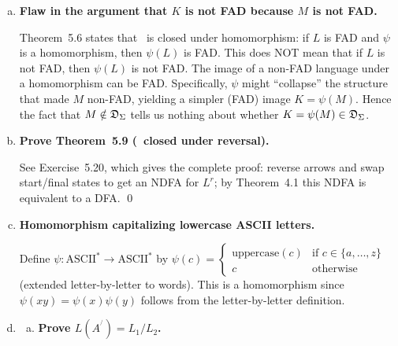 \begin{enumerate}[{5.}1. ]
\begin{enumerate}[(a)]
If we set the final states of $A$ to be the ``midpoint'' states (states reached after processing the first half of words in $L$), we get an automaton that accepts words that reach these midpoint states---but the midpoint states depend on the word being processed, and cannot be determined without knowing the length of the word.  Different words lead to different midpoints; the machine cannot simultaneously track multiple midpoints.  (The ``midpoint'' set would need to be the set of all states from which any final state is reachable in the same number of steps as were taken to reach the midpoint---this is not a fixed set of states for all words.)

\item \textbf{Flaw in the argument that $K$ is not FAD because $M$ is not FAD.}

Theorem~5.6 states that \DSIG\ is closed under homomorphism: if $L$ is FAD and $\psi$ is a homomorphism, then $\psi(L)$ is FAD.  This does NOT mean that if $L$ is not FAD, then $\psi(L)$ is not FAD.  The image of a non-FAD language under a homomorphism can be FAD.  Specifically, $\psi$ might ``collapse'' the structure that made $M$ non-FAD, yielding a simpler (FAD) image $K=\psi(M)$.  Hence the fact that $M\notin\mathfrak{D}_\Sigma$ tells us nothing about whether $K=\psi(M)\in\mathfrak{D}_\Sigma$.

\item \textbf{Prove Theorem~5.9 (\DSIG\ closed under reversal).}

See Exercise~5.20, which gives the complete proof: reverse arrows and swap start/final states to get an NDFA for $L^r$; by Theorem~4.1 this NDFA is equivalent to a DFA. \qed

\item \textbf{Homomorphism capitalizing lowercase ASCII letters.}

Define $\psi:\text{ASCII}^*\to\text{ASCII}^*$ by
$\psi(c)=\begin{cases}\text{uppercase}(c) & \text{if }c\in\{a,\ldots,z\} \\ c & \text{otherwise}\end{cases}$
(extended letter-by-letter to words).  This is a homomorphism since $\psi(xy)=\psi(x)\psi(y)$ follows from the letter-by-letter definition.

\item \begin{enumerate}[(a)]
  \item \textbf{Prove $L(A^{^/})=L_1/L_2$.}


\end{enumerate}
\end{enumerate}
\end{enumerate}
